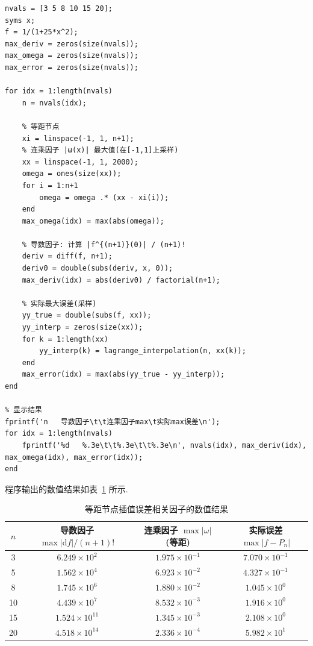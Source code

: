 \documentclass[12pt,a4paper]{ctexart}
\begin{document}
\begin{lstlisting}[caption={等距节点 Lagrange 插值误差分析}, label=code:error_analysis]
nvals = [3 5 8 10 15 20];
syms x;
f = 1/(1+25*x^2);
max_deriv = zeros(size(nvals));
max_omega = zeros(size(nvals));
max_error = zeros(size(nvals));

for idx = 1:length(nvals)
    n = nvals(idx);
    
    % 等距节点
    xi = linspace(-1, 1, n+1);
    % 连乘因子 |ω(x)| 最大值(在[-1,1]上采样)
    xx = linspace(-1, 1, 2000);
    omega = ones(size(xx));
    for i = 1:n+1
        omega = omega .* (xx - xi(i));
    end
    max_omega(idx) = max(abs(omega));
    
    % 导数因子: 计算 |f^{(n+1)}(0)| / (n+1)!
    deriv = diff(f, n+1);
    deriv0 = double(subs(deriv, x, 0));
    max_deriv(idx) = abs(deriv0) / factorial(n+1);
    
    % 实际最大误差(采样)
    yy_true = double(subs(f, xx));
    yy_interp = zeros(size(xx));
    for k = 1:length(xx)
        yy_interp(k) = lagrange_interpolation(n, xx(k));
    end
    max_error(idx) = max(abs(yy_true - yy_interp));
end

% 显示结果
fprintf('n   导数因子\t\t连乘因子max\t实际max误差\n');
for idx = 1:length(nvals)
    fprintf('%d   %.3e\t\t%.3e\t\t%.3e\n', nvals(idx), max_deriv(idx), max_omega(idx), max_error(idx));
end
\end{lstlisting}
程序输出的数值结果如表~\ref{tab:results} 所示. 

\begin{table}[H]
\centering
\caption{等距节点插值误差相关因子的数值结果}
\label{tab:results}
\begin{tabular}{cccc}
\toprule
$n$ & 导数因子 $\max|\mathrm{d}f|/(n+1)!$ & 连乘因子 $\max|\omega|$ (等距) & 实际误差 $\max|f-P_n|$ \\
\midrule
3  & $6.249\times10^{2}$  & $1.975\times10^{-1}$ & $7.070\times10^{-1}$ \\
5  & $1.562\times10^{4}$  & $6.923\times10^{-2}$ & $4.327\times10^{-1}$ \\
8  & $1.745\times10^{6}$  & $1.880\times10^{-2}$ & $1.045\times10^{0}$ \\
10 & $4.439\times10^{7}$  & $8.532\times10^{-3}$ & $1.916\times10^{0}$ \\
15 & $1.524\times10^{11}$ & $1.345\times10^{-3}$ & $2.108\times10^{0}$ \\
20 & $4.518\times10^{14}$ & $2.336\times10^{-4}$ & $5.982\times10^{1}$ \\
\bottomrule
\end{tabular}
\end{table}
\end{document}
